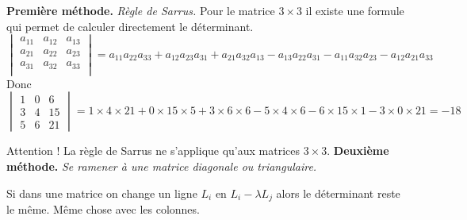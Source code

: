 {{\textbf{Première méthode.} \emph{Règle de Sarrus.} 
Pour le matrice $3\times 3$ il existe une formule qui permet de calculer directement le déterminant.
$$\begin{vmatrix} 
a_{11} & a_{12} & a_{13} \\   
a_{21} & a_{22} & a_{23} \\  
a_{31} & a_{32} & a_{33} \\ 
  \end{vmatrix}
= a_{11}a_{22}a_{33} + a_{12}a_{23}a_{31} + a_{21}a_{32}a_{13}
- a_{13}a_{22}a_{31} - a_{11} a_{32}a_{23}  - a_{12}a_{21}a_{33}$$
Donc 
$$\begin{vmatrix}
    1 & 0 & 6 \\
    3 & 4 & 15\\
    5 & 6 & 21
  \end{vmatrix}
= 1\times 4 \times 21 + 0 \times 15 \times 5 + 3\times 6 \times 6
- 5\times 4\times 6 -6\times 15 \times 1 -3 \times 0 \times 21 = -18$$


Attention ! La règle de Sarrus ne s'applique qu'aux matrices $3\times 3$.
\textbf{Deuxième méthode.} \emph{Se ramener à une matrice diagonale ou triangulaire.}


Si dans une matrice on change un ligne $L_i$ en $L_i-\lambda L_j$ alors le déterminant reste le même.
Même chose avec les colonnes. 

}}
